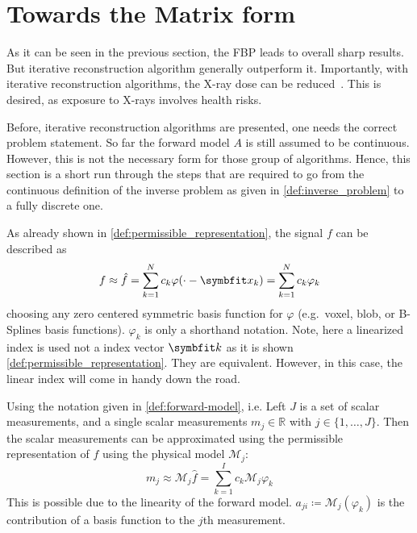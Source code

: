 \section{Towards the Matrix form}\label{sec:matrix_formulation}

As it can be seen in the previous section, the \gls{FBP} leads to overall sharp results. But
iterative reconstruction algorithm generally outperform it. Importantly, with iterative
reconstruction algorithms, the X-ray dose can be reduced~\cite{willemink_evolution_2019}. This is
desired, as exposure to X-rays involves health risks.

Before, iterative reconstruction algorithms are presented, one needs the correct problem statement.
So far the forward model \(A\) is still assumed to be continuous. However, this is not the necessary
form for those group of algorithms. Hence, this section is a short run through the steps that are
required to go from the continuous definition of the inverse problem as given in
\autoref{def:inverse_problem} to a fully discrete one.

As already shown in \autoref{def:permissible_representation}, the signal \(f\) can be described as
\begin{equation}
	f \approx \near{f} = \sum_{k=1}^{N} c_k \varphi(\cdot - \mvec{x}_k) = \sum_{k=1}^{N} c_k \varphi_k
\end{equation}
choosing any zero centered symmetric basis function for \(\varphi\) (e.g.\ voxel, blob, or B-Splines
basis functions). \(\varphi_k\) is only a shorthand notation. Note, here a linearized index is used
not a index vector \(\mvec{k}\) as it is shown \autoref{def:permissible_representation}. They are
equivalent. However, in this case, the linear index will come in handy down the road.

Using the notation given in \autoref{def:forward-model}, i.e. Left \(J\) is a set of scalar
measurements, and a single scalar measurements \(m_j \in \mathbb{R}\) with \(j \in \lbrace 1, \dots,
J \rbrace\). Then the scalar measurements can be approximated using the permissible representation
of \(f\) using the physical model \(\mathscr{M}_j\):
\begin{equation}
	m_j \approx \mathscr{M}_j\hat{f} = \sum_{k=1}^{I} c_k \mathscr{M}_j\varphi_k
\end{equation}
This is possible due to the linearity of the forward model. \(a_{ji} \coloneq
\mathscr{M}_j(\varphi_k)\) is the contribution of a basis function to the \(j\)th measurement.

